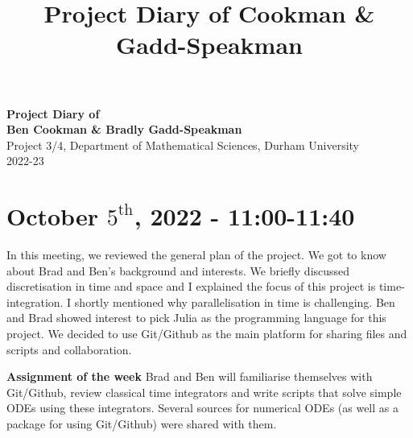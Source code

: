\documentclass[11pt]{article}
\theoremstyle{definition}
\begin{document}
\setcounter{section}{0}
\title{Project Diary of Cookman \& Gadd-Speakman}

\thispagestyle{empty}

\begin{center}
{\LARGE \bf Project Diary of \\
Ben Cookman \& Bradly Gadd-Speakman}\\
{\Large Project 3/4, Department of Mathematical Sciences, Durham University}\\
{\Large 2022-23}
\end{center}
\section{October $5^{\text{th}}$, 2022 - 11:00-11:40}
In this meeting, we reviewed the general plan of the project. We got to know about Brad and Ben's background and interests. We briefly discussed discretisation in time and space and I explained the focus of this project is time-integration. I shortly mentioned why parallelisation in time is challenging. Ben and Brad showed interest to pick Julia as the programming language for this project. We decided to use Git/Github as the main platform for sharing files and scripts and collaboration. 
\begin{shaded}
\textbf{Assignment of the week} \newline
Brad and Ben will familiarise themselves with Git/Github, review classical time integrators and write scripts that solve simple ODEs using these integrators. Several sources for numerical ODEs (as well as a package for using Git/Github) were shared with them.
\end{shaded}
\end{document}
